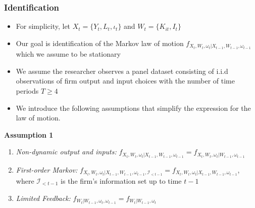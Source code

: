 \documentclass{beamer}
\begin{document}
\begin{frame}
\frametitle{Identification}
\begin{itemize}
\item For simplicity, let $X_{t}=\{Y_{t}, L_{t}, \iota_{t}\}$ and $W_{t}=\{K_{it}, I_{t}\}$
\item Our goal is identification of the Markov law of motion $f_{X_{t}, W_{t}, \omega_{t}|X_{t-1}, W_{t-1}, \omega_{t-1}}$ which we assume to be stationary
\item We assume the researcher observes a panel dataset consisting of i.i.d observations of firm output and input choices with the number of time periods $T\geq 4$
\item We introduce the following assumptions that simplify the expression for the law of motion. 
\end{itemize}
\textbf{Assumption 1}
\begin{enumerate}
    \item \textit{Non-dynamic output and inputs:} $f_{X_{t}, W_{t}, \omega_{t}|X_{t-1}, W_{t-1}, \omega_{t-1}}=f_{X_{t}, W_{t}, \omega_{t}|W_{t-1}, \omega_{t-1}}$
    \item \textit{First-order Markov:} $f_{X_{t}, W_{t}, \omega_{t}|X_{t-1}, W_{t-1}, \omega_{t-1}, \mathcal{I}_{<t-1}}=f_{X_{t}, W_{t}, \omega_{t}|X_{t-1}, W_{t-1}, \omega_{t-1}}$, where $\mathcal{I}_{<t-1}$ is the firm's information set up to time $t-1$
    \item \textit{Limited Feedback:} $f_{W_{t}|W_{t-1}, \omega_{t}, \omega_{t-1}}=f_{W_{t}|W_{t-1}, \omega_{t}}$ 
\end{enumerate}
\end{frame}
\end{document}
